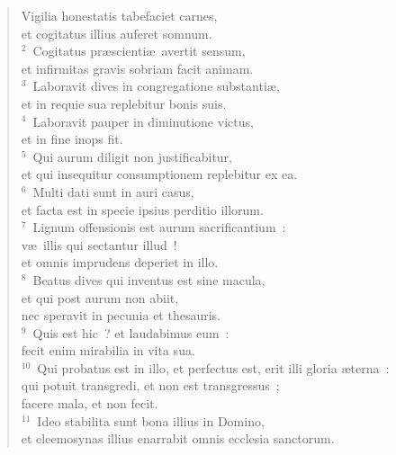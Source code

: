 \begin{flushleft}\begin{verse}\vspace{-19pt}\hspace{6pt}Vigilia honestatis tabefaciet carnes,\\\hspace{6pt} et cogitatus illius auferet somnum.\\
${}^{2}$~Cogitatus pr\ae scienti\ae\ avertit sensum,\\ et infirmitas gravis sobriam facit animam.\\
${}^{3}$~Laboravit dives in congregatione substanti\ae ,\\ et in requie sua replebitur bonis suis.\\
${}^{4}$~Laboravit pauper in diminutione victus,\\ et in fine inops fit.\\
${}^{5}$~Qui aurum diligit non justificabitur,\\ et qui insequitur consumptionem replebitur ex ea.\\
${}^{6}$~Multi dati sunt in auri casus,\\ et facta est in specie ipsius perditio illorum.\\
${}^{7}$~Lignum offensionis est aurum sacrificantium~:\\ v\ae\ illis qui sectantur illud~!\\ et omnis imprudens deperiet in illo.\\
${}^{8}$~Beatus dives qui inventus est sine macula,\\ et qui post aurum non abiit,\\ nec speravit in pecunia et thesauris.\\
${}^{9}$~Quis est hic~? et laudabimus eum~:\\ fecit enim mirabilia in vita sua.\\
${}^{10}$~Qui probatus est in illo, et perfectus est, erit illi gloria \ae terna~:\\ qui potuit transgredi, et non est transgressus~;\\ facere mala, et non fecit.\\
${}^{11}$~Ideo stabilita sunt bona illius in Domino,\\ et eleemosynas illius enarrabit omnis ecclesia sanctorum.\end{verse}\end{flushleft}


